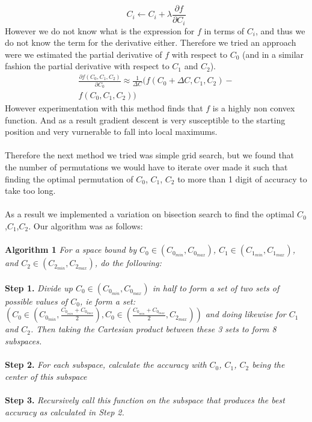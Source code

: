 \documentclass[11pt]{article}
\begin{document}
\begin{multicols}{2}
$$C_i\leftarrow C_i+\lambda \frac{\partial f}{\partial C_i}$$
However we do not know what is the expression for $f$ in terms of $C_i$,
and thus we do not know the term for the derivative either. Therefore we tried an approach were we estimated the partial derivative of $f$ with respect to $C_0$ (and in a similar fashion the partial derivative with respect to $C_1$ and $C_2$).
\begin{multline*}
    \frac{\partial f(C_0,C_1,C_2)}{\partial C_0}\approx \frac{1}{\Delta C}
    (f(C_0+\Delta C,C_1,C_2)-\\ f(C_0,C_1,C_2))
\end{multline*}
However experimentation with this method finds that $f$ is a highly non convex function. And as a result gradient descent is very susceptible to the starting position and very vurnerable to fall into local maximums.\\\\
Therefore the next method we tried was simple grid search, but we found that the number of permutations we would have to iterate over made it such that finding the optimal permutation of $C_0$, $C_1$, $C_2$ to more than 1 digit of accuracy to take too long.\\\\
As a result we implemented a variation on bisection search to find the optimal $C_0$,$C_1$,$C_2$. Our algorithm was as follows:\\\\
\textbf{Algorithm 1} \textit{For a space bound by $C_0\in (C_{0_{min}},C_{0_{max}})$, $C_1\in (C_{1_{min}},C_{1_{max}})$, and $C_2\in (C_{2_{min}},C_{2_{max}})$, do the following:}\\\\
\textbf{Step 1.} \textit{Divide up $C_0\in (C_{0_{min}},C_{0_{max}})$ in half to form a set of two sets of possible values of $C_0$, ie form a set: $\left(C_0\in (C_{0_{min}},\frac{C_{0_{min}}+C_{0_{max}}}{2}), 
C_0\in (\frac{C_{0_{min}}+C_{0_{max}}}{2},C_{2_{max}})\right)$
and doing likewise for $C_1$ and $C_2$. Then taking the Cartesian product
between these 3 sets to form 8 subspaces.
}
\\\\
\textbf{Step 2.} \textit{For each subspace, calculate the accuracy with $C_0$, $C_1$, $C_2$ being the center of this subspace}\\\\
\textbf{Step 3.} \textit{Recursively call this function on the subspace that produces the best accuracy as calculated in Step 2.}\\\\

\end{multicols}
\end{document}
